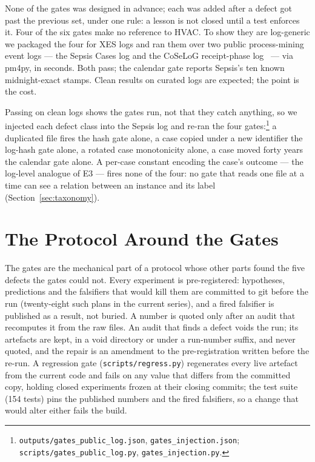 \documentclass[runningheads]{llncs}
\begin{document}
None of the gates was designed in advance; each was added after a defect got past the previous set, under one rule: a lesson is not closed until a test enforces it. Four of the six gates make no reference to HVAC. To show they are log-generic we packaged the four for XES logs and ran them over two public process-mining event logs --- the Sepsis Cases log \cite{mannhardt2016sepsis} and the CoSeLoG receipt-phase log~\cite{buijs2014receipt} --- via pm4py, in seconds. Both pass; the calendar gate reports Sepsis's ten known midnight-exact stamps. Clean results on curated logs are expected; the point is the cost.

Passing on clean logs shows the gates run, not that they catch anything, so we injected each defect class into the Sepsis log and re-ran the four gates:\footnote{\texttt{outputs/gates\_public\_log.json}, \texttt{gates\_injection.json}; \texttt{scripts/gates\_public\_log.py}, \texttt{gates\_injection.py}.} a duplicated file fires the hash gate alone, a case copied under a new identifier the log-hash gate alone, a rotated case monotonicity alone, a case moved forty years the calendar gate alone. A per-case constant encoding the case's outcome --- the log-level analogue of E3 --- fires none of the four: no gate that reads one file at a time can see a relation between an instance and its label (Section~\ref{sec:taxonomy}).

\section{The Protocol Around the Gates}
\label{sec:protocol}

The gates are the mechanical part of a protocol whose other parts found the five defects the gates could not. Every experiment is pre-registered: hypotheses, predictions and the falsifiers that would kill them are committed to git before the run (twenty-eight such plans in the current series), and a fired falsifier is published as a result, not buried. A number is quoted only after an audit that recomputes it from the raw files. An audit that finds a defect voids the run; its artefacts are kept, in a void directory or under a run-number suffix, and never quoted, and the repair is an amendment to the pre-registration written before the re-run. A regression gate (\texttt{scripts/regress.py}) regenerates every live artefact from the current code and fails on any value that differs from the committed copy, holding closed experiments frozen at their closing commits; the test suite (154 tests) pins the published numbers and the fired falsifiers, so a change that would alter either fails the build.
\end{document}
